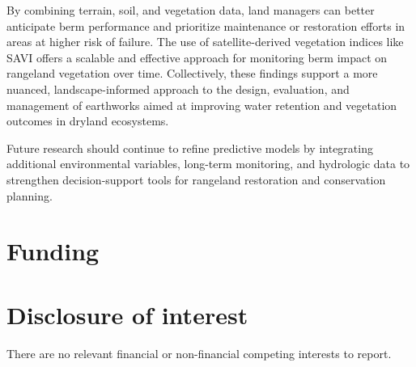 \documentclass[review]{elsarticle}
\begin{document}
By combining terrain, soil, and vegetation data, land managers can better anticipate berm performance and prioritize maintenance or restoration efforts in areas at higher risk of failure. The use of satellite-derived vegetation indices like SAVI offers a scalable and effective approach for monitoring berm impact on rangeland vegetation over time. Collectively, these findings support a more nuanced, landscape-informed approach to the design, evaluation, and management of earthworks aimed at improving water retention and vegetation outcomes in dryland ecosystems.

Future research should continue to refine predictive models by integrating additional environmental variables, long-term monitoring, and hydrologic data to strengthen decision-support tools for rangeland restoration and conservation planning.

\section*{Funding}

 

\section*{Disclosure of interest}

There are no relevant financial or non-financial competing interests to report.



\end{document}
